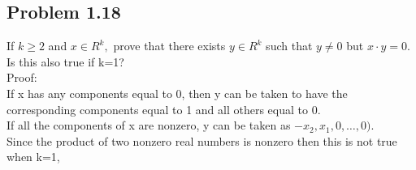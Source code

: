 \subsection{Problem 1.18}
If $k \geq 2$ and $x \in R^k,$ prove that there exists $y \in R^k$ such that $y \neq 0$ but $x \cdot y =0.$ Is this also true if k=1? \\ 
Proof: \\ 
If x has any components equal to 0, then y can be taken to have the corresponding components equal to 1 and all others equal to 0.\\
If all the components of x are nonzero, y can be taken as $-x_2,x_1,0, \dots,0).$ \\
Since the product of two nonzero real numbers is nonzero then this is not true when k=1, \\ 
\\
\begin{figure}[ht]\end{figure} 




